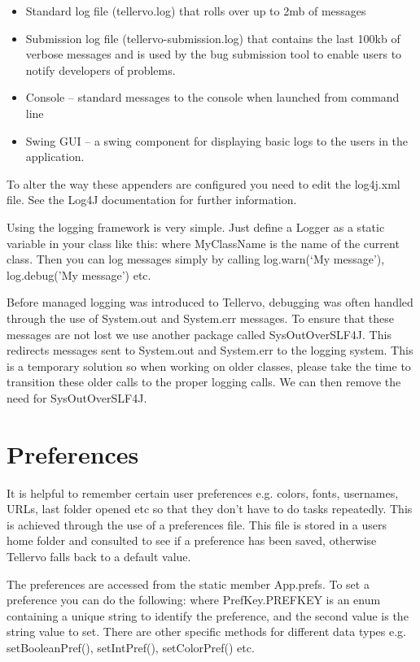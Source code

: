 \begin{itemize}
 \item Standard log file (tellervo.log) that rolls over up to 2mb of messages
 \item Submission log file (tellervo-submission.log) that contains the last 100kb of verbose messages and is used by the bug submission tool to enable users to notify developers of problems.
 \item Console -- standard messages to the console when launched from command line
 \item Swing GUI -- a swing component for displaying basic logs to the users in the application.
\end{itemize}

To alter the way these appenders are configured you need to edit the log4j.xml file.  See the Log4J documentation for further information.

Using the logging framework is very simple.  Just define a Logger as a static variable in your class like this:
where MyClassName is the name of the current class.  Then you can log messages simply by calling log.warn(`My message'), log.debug('My message') etc.

Before managed logging was introduced to Tellervo, debugging was often handled through the use of System.out and System.err messages.  To ensure that these messages are not lost we use another package called SysOutOverSLF4J.  This redirects messages sent to System.out and System.err to the logging system.  This is a temporary solution so when working on older classes, please take the time to transition these older calls to the proper logging calls.  We can then remove the need for SysOutOverSLF4J.


\section{Preferences}
It is helpful to remember certain user preferences e.g. colors, fonts, usernames, URLs, last folder opened etc so that they don't have to do tasks repeatedly.  This is achieved through the use of a preferences file.  This file is stored in a users home folder and consulted to see if a preference has been saved, otherwise Tellervo falls back to a default value.  

The preferences are accessed from the static member App.prefs.  To set a preference you can do the following:
where PrefKey.PREFKEY is an enum containing a unique string to identify the preference, and the second value is the string value to set.  There are other specific methods for different data types e.g. setBooleanPref(), setIntPref(), setColorPref() etc.

